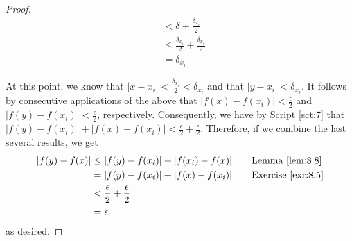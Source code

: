 \documentclass[../main.tex]{subfiles}
\begin{document}
\begin{theorem}
\begin{proof}
\begin{align*}
            &< \delta+\frac{\delta_{x_i}}{2}\\
            &\leq \frac{\delta_{x_i}}{2}+\frac{\delta_{x_i}}{2}\\
            &= \delta_{x_i}
        \end{align*}\par
        At this point, we know that $|x-x_i|<\frac{\delta_{x_i}}{2}<\delta_{x_i}$ and that $|y-x_i|<\delta_{x_i}$. It follows by consecutive applications of the above that $|f(x)-f(x_i)|<\frac{\epsilon}{2}$ and $|f(y)-f(x_i)|<\frac{\epsilon}{2}$, respectively. Consequently, we have by Script \ref{sct:7} that $|f(y)-f(x_i)|+|f(x)-f(x_i)|<\frac{\epsilon}{2}+\frac{\epsilon}{2}$. Therefore, if we combine the last several results, we get
        \begin{align*}
            |f(y)-f(x)| &\leq |f(y)-f(x_i)|+|f(x_i)-f(x)|\tag*{Lemma \ref{lem:8.8}}\\
            &= |f(y)-f(x_i)|+|f(x)-f(x_i)|\tag*{Exercise \ref{exr:8.5}}\\
            &< \frac{\epsilon}{2}+\frac{\epsilon}{2}\\
            &= \epsilon
        \end{align*}
        as desired.
    \end{proof}
\end{theorem}
\end{document}
